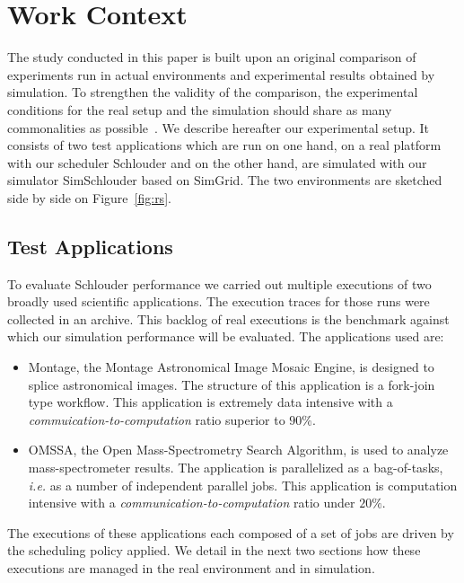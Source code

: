 \documentclass[10pt,conference,compsocconf]{IEEEtran}
\begin{document}
\section{Work Context}
\label{sec:work-context}

The  study conducted  in this  paper  is built upon an  original comparison  of
experiments  run in  actual environments  and experimental  results obtained  by
simulation.   To strengthen  the validity  of the  comparison, the  experimental
conditions  for  the  real  setup  and  the  simulation  should  share  as  many
commonalities  as   possible~\cite{PucherGWK15}.   We  describe   hereafter  our
experimental setup.  It consists of two  test applications which are  run on one
hand, on a real platform with our scheduler Schlouder and on the other hand, are
simulated  with   our  simulator  SimSchlouder   based  on  SimGrid.    The  two
environments are sketched side by side on Figure~\ref{fig:rs}.

\subsection{Test Applications}\label{sc:setup}

To  evaluate Schlouder  performance we  carried out  multiple executions  of two
broadly used scientific  applications. The execution traces for  those runs were
collected  in an  archive.  This backlog  of real  executions  is the  benchmark
against which  our simulation  performance will  be evaluated.  The applications
used are:

\begin{itemize}
\item Montage\cite{montage2009},  the Montage Astronomical Image  Mosaic Engine,
  is designed to  splice astronomical images. The structure  of this application
  is a  fork-join type  workflow. This application  is extremely  data intensive
  with a \emph{commuication-to-computation} ratio superior to $90\%$.

\item OMSSA\cite{Geer2004}, the Open Mass-Spectrometry Search Algorithm, is used
  to analyze  mass-spectrometer results.  The application  is parallelized  as a
  bag-of-tasks, \textit{i.e.}  as a  number of  independent parallel  jobs. This
  application        is        computation        intensive        with        a
  \emph{communication-to-computation} ratio under $20\%$.
\end{itemize}

The executions of these applications each composed  of a set of jobs are driven
by the scheduling policy applied. We detail in the next two sections how these
executions are managed in the real environment and in simulation.  
\end{document}
